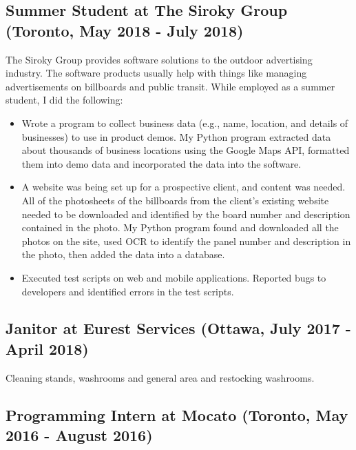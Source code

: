 \documentclass[11pt]{article}
\begin{document}
		\subsection{Summer Student at The Siroky Group (Toronto, May 2018 - July 2018)}
		\noindent The Siroky Group provides software solutions to the outdoor advertising industry. The software products usually help with things like managing advertisements on billboards and public transit. While employed as a summer student, I did the following:
		\begin{itemize}
		\item Wrote a program to collect business data (e.g., name, location, and details of businesses) to use in product demos. My Python program extracted data about thousands of business locations using the Google Maps API, formatted them into demo data and incorporated the data into the software. 
		\item A website was being set up for a prospective client, and content was needed. All of the photosheets of the billboards from the client's existing website needed to be downloaded and identified by the board number and description contained in the photo. My Python program found and downloaded all the photos on the site, used OCR to identify the panel number and description in the photo, then added the data into a database. 
		\item Executed test scripts on web and mobile applications. Reported bugs to developers and identified errors in the test scripts.
		\end{itemize}
		\subsection{Janitor at Eurest Services (Ottawa, July 2017 - April 2018)}
		\noindent Cleaning stands, washrooms and general area and restocking washrooms.
		\subsection{Programming Intern at Mocato (Toronto, May 2016 - August 2016)}
		
\end{document}
